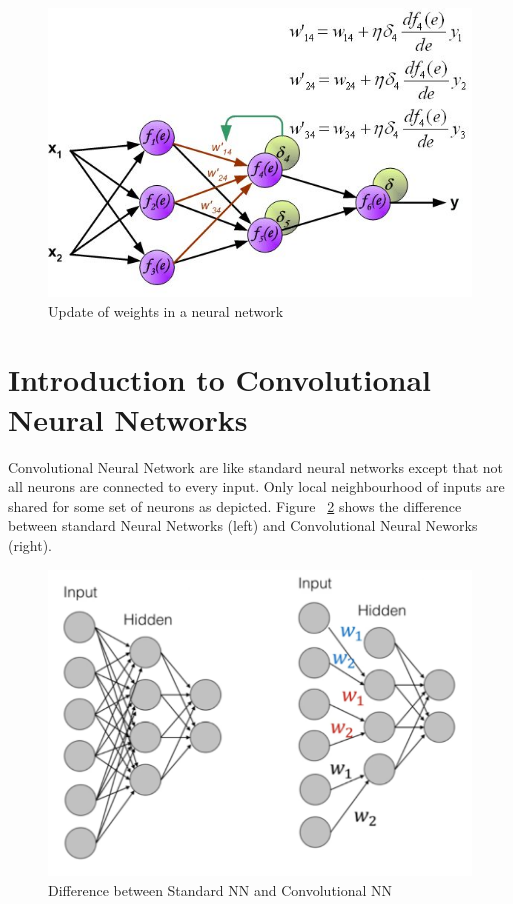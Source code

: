 \begin{enumerate}
\begin{figure}[H]
	\centering
   \includegraphics[scale=0.66]{figures/intro/weight_update.bmp}
   \caption[Weight Update]{Update of weights in a neural network}
   \label{fig:weight_update}
\end{figure}


\end{enumerate}

\section{Introduction to Convolutional Neural Networks}

Convolutional Neural Network are like standard neural networks except that not all neurons are connected to every input. 
Only local neighbourhood of inputs are shared for some set of neurons as depicted. Figure ~\ref{fig:cnn} shows the difference between standard Neural Networks (left) and Convolutional Neural Neworks (right).

\begin{figure}[H]
	\centering
   \includegraphics[scale=0.66]{figures/intro/cnn.png}
   \caption[Convolutional Neural Network]{Difference between Standard NN and Convolutional NN}
   \label{fig:cnn}
\end{figure}
